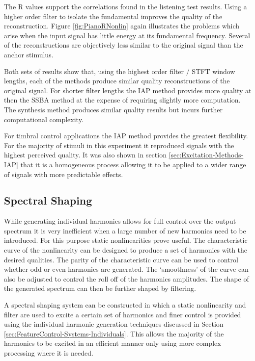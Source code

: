 		The R values support the correlations found in the listening test results. Using a higher order
		filter to isolate the fundamental improves the quality of the reconstruction. Figure \ref{fig:PianoRNonlin}
		again illustrates the problems which arise when the input signal has little energy at its fundamental
		frequency. Several of the reconstructions are objectively less similar to the original signal than the
		anchor stimulus.

		Both sets of results show that, using the highest order filter / STFT window lengths, each of the methods
		produce similar quality reconstructions of the original signal. For shorter filter lengths the IAP method
		provides more quality at then the SSBA method at the expense of requiring slightly more computation. The
		synthesis method produces similar quality results but incurs further computational complexity. 
		
		For timbral control applications the IAP method provides the greatest flexibility. For the majority of
		stimuli in this experiment it reproduced signals with the highest perceived quality. It was also shown in
		section \ref{sec:Excitation-Methods-IAP} that it is a homogeneous process allowing it to be applied to
		a wider range of signals with more predictable effects.

	\subsection{Spectral Shaping}
	\label{sec:FeatureControl-Systems-SpectralShaping}
		While generating individual harmonics allows for full control over the output spectrum it is very
		inefficient when a large number of new harmonics need to be introduced. For this purpose static
		nonlinearities prove useful. The characteristic curve of the nonlinearity can be designed to produce a set
		of harmonics with the desired qualities. The parity of the characteristic curve can be used to control
		whether odd or even harmonics are generated. The `smoothness' of the curve can also be adjusted to control
		the roll off of the harmonics amplitudes. The shape of the generated spectrum can then be further shaped by
		filtering.

		A spectral shaping system can be constructed in which a static nonlinearity and filter are used to excite a
		certain set of harmonics and finer control is provided using the individual harmonic generation techniques
		discussed in Section \ref{sec:FeatureControl-Systems-Individuals}. This allows the majority of the
		harmonics to be excited in an efficient manner only using more complex processing where it is needed.

